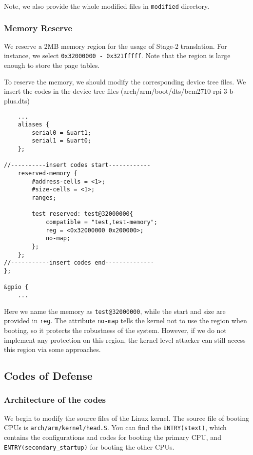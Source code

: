 Note, we also provide the whole modified files in \texttt{modified} 
directory.


\subsubsection{Memory Reserve}

We reserve a 2MB memory region for the usage of Stage-2 translation. 
For instance, we select \texttt{0x32000000 - 0x321fffff}. Note that 
the region is large enough to store the page tables.

To reserve the memory, we should modify the corresponding device tree 
files. We insert the codes in the device tree files 
(arch/arm/boot/dts/bcm2710-rpi-3-b-plus.dts)
\begin{lstlisting}
	...
	aliases {
		serial0 = &uart1;
		serial1 = &uart0;
	};

//----------insert codes start------------
	reserved-memory {
		#address-cells = <1>;
		#size-cells = <1>;
		ranges;
		
		test_reserved: test@32000000{
			compatible = "test,test-memory";
			reg = <0x32000000 0x200000>;
			no-map;
		};
	};
//-----------insert codes end--------------
};

&gpio {
	...
\end{lstlisting}



Here we name the memory as \texttt{test@32000000}, while the start and size are provided in \texttt{reg}. The attribute \texttt{no-map} tells the kernel not to use the region when booting, so it protects the robustness of the system. However, if we do not implement any protection on this region, the kernel-level attacker can still access this region via some approaches.

\subsection{Codes of Defense}

\subsubsection{Architecture of the codes}

We begin to modify the source files of the Linux kernel. The source file of booting CPUs is \texttt{arch/arm/kernel/head.S}. You can find the \texttt{ENTRY(stext)}, which contains the configurations and codes for booting the primary CPU, and \texttt{ENTRY(secondary\_startup)} for booting the other CPUs. 

